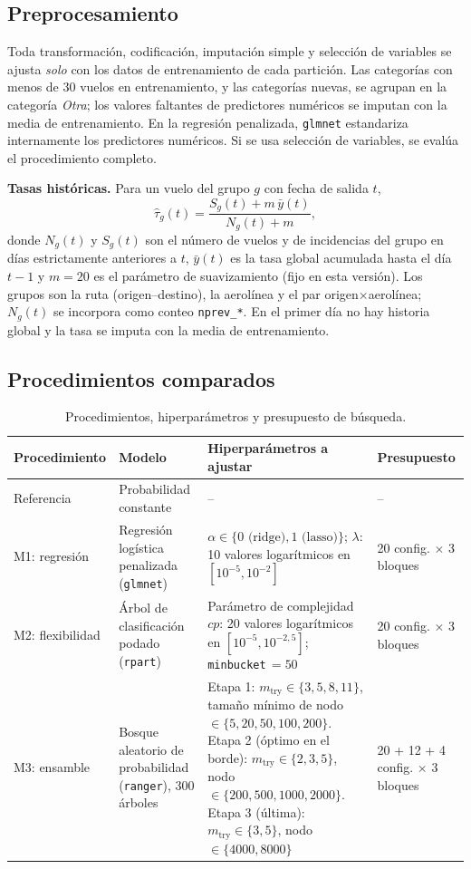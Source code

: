\documentclass[11pt,a4paper]{article}
\newcommand{\code}[1]{\texttt{#1}}
\begin{document}
\subsection{Preprocesamiento}
Toda transformación, codificación, imputación simple y selección de variables se ajusta \emph{solo} con los datos de entrenamiento de cada partición. Las categorías con menos de 30 vuelos en entrenamiento, y las categorías nuevas, se agrupan en la categoría \emph{Otra}; los valores faltantes de predictores numéricos se imputan con la media de entrenamiento. En la regresión penalizada, \code{glmnet} estandariza internamente los predictores numéricos. Si se usa selección de variables, se evalúa el procedimiento completo.
 
\textbf{Tasas históricas.} Para un vuelo del grupo $g$ con fecha de salida $t$,
\[
  \hat\tau_g(t) = \frac{S_g(t) + m\,\bar y(t)}{N_g(t) + m},
\]
donde $N_g(t)$ y $S_g(t)$ son el número de vuelos y de incidencias del grupo en días estrictamente anteriores a $t$, $\bar y(t)$ es la tasa global acumulada hasta el día $t-1$ y $m = 20$ es el parámetro de suavizamiento (fijo en esta versión). Los grupos son la ruta (origen--destino), la aerolínea y el par origen$\times$aerolínea; $N_g(t)$ se incorpora como conteo \code{nprev\_*}. En el primer día no hay historia global y la tasa se imputa con la media de entrenamiento.
 
\subsection{Procedimientos comparados}
\begin{table}[ht]
\centering
\caption{Procedimientos, hiperparámetros y presupuesto de búsqueda.}
\label{tab:metodos}
\small
\begin{tabularx}{\textwidth}{@{}L{2.2cm}L{3.4cm}XL{2.2cm}@{}}
\toprule
Procedimiento & Modelo & Hiperparámetros a ajustar & Presupuesto \\
\midrule
Referencia & Probabilidad constante & -- & -- \\
\addlinespace
M1: regresión & Regresión logística penalizada (\code{glmnet}) & $\alpha\in\{0\text{ (ridge)},1\text{ (lasso)}\}$; $\lambda$: 10 valores logarítmicos en $[10^{-5},10^{-2}]$ & 20 config. $\times$ 3 bloques \\
\addlinespace
M2: flexibilidad & Árbol de clasificación podado (\code{rpart}) & Parámetro de complejidad $cp$: 20 valores logarítmicos en $[10^{-5},10^{-2{,}5}]$; \code{minbucket}\,$=50$ & 20 config. $\times$ 3 bloques \\
\addlinespace
M3: ensamble & Bosque aleatorio de probabilidad (\code{ranger}), 300 árboles & Etapa 1: $m_{\text{try}}\in\{3,5,8,11\}$, tamaño mínimo de nodo $\in\{5,20,50,100,200\}$. Etapa 2 (óptimo en el borde): $m_{\text{try}}\in\{2,3,5\}$, nodo $\in\{200,500,1000,2000\}$. Etapa 3 (última): $m_{\text{try}}\in\{3,5\}$, nodo $\in\{4000,8000\}$ & 20 + 12 + 4 config. $\times$ 3 bloques \\
\bottomrule
\end{tabularx}
\end{table}
 
\end{document}
